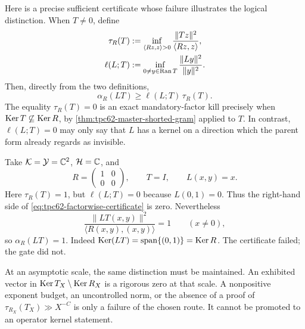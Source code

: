 Here is a precise sufficient certificate whose failure illustrates the
logical distinction.  When \(T\ne0\), define
\begin{align}
 \tau_R(T)
 &:=\inf_{\langle Rz,z\rangle>0}
   \frac{\|Tz\|^2}{\langle Rz,z\rangle},
 \label{eq:tpc62-tau-T}\\
 \ell(L;T)
 &:=\inf_{0\ne y\in\operatorname{Ran} T}
   \frac{\|Ly\|^2}{\|y\|^2}.
 \label{eq:tpc62-ell-LT}
\end{align}
Then, directly from the two definitions,
\begin{equation}
 \alpha_R(LT)\ge \ell(L;T)\,\tau_R(T).
 \label{eq:tpc62-factorwise-certificate}
\end{equation}
The equality \(\tau_R(T)=0\) is an exact mandatory-factor kill precisely
when \(\operatorname{Ker} T\not\subseteq\operatorname{Ker} R\), by
\cref{thm:tpc62-master-shorted-gram} applied to \(T\).  In contrast,
\(\ell(L;T)=0\) may only say that \(L\) has a kernel on a direction which
the parent form already regards as invisible.

\begin{example}
\label{ex:tpc62-factor-certificate-failure}
Take \(\mathcal K=\mathcal Y=\mathbb C^2\), \(\mathcal H=\mathbb C\), and
\begin{equation}
 R=\begin{pmatrix}1&0\\0&0\end{pmatrix},
 \qquad T=I,
 \qquad L(x,y)=x.
 \label{eq:tpc62-factor-certificate-example}
\end{equation}
Here \(\tau_R(T)=1\), but \(\ell(L;T)=0\) because
\(L(0,1)=0\).  Thus the right-hand side of
\eqref{eq:tpc62-factorwise-certificate} is zero.  Nevertheless
\begin{equation}
 \frac{\|LT(x,y)\|^2}{\langle R(x,y),(x,y)\rangle}=1
 \qquad(x\ne0),
 \label{eq:tpc62-factor-certificate-example-ratio}
\end{equation}
so \(\alpha_R(LT)=1\).  Indeed
\(\operatorname{Ker}(LT)=\operatorname{span}\{(0,1)\}=\operatorname{Ker} R\).
The certificate failed; the gate did not.
\end{example}

At an asymptotic scale, the same distinction must be maintained.  An
exhibited vector in \(\operatorname{Ker} T_X\setminus\operatorname{Ker} R_X\) is a rigorous zero at
that scale.  A nonpositive exponent budget, an uncontrolled norm, or the
absence of a proof of \(\tau_{R_X}(T_X)\gg X^{-C}\) is only a failure of
the chosen route.  It cannot be promoted to an operator kernel statement.
